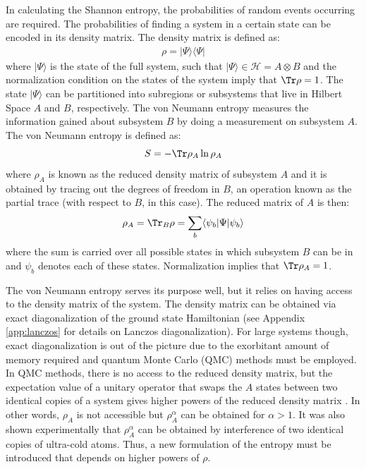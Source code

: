 	In calculating the Shannon entropy, the probabilities of random events occurring are required. The probabilities of finding a system in a certain state can be encoded in its density matrix. The density matrix is defined as:	
	\begin{align}
	\label{eq:densityMatrix}
	\rho = \vert \Psi \rangle \langle \Psi \vert
	\end{align}
	where $\vert\Psi\rangle$ is the state of the full system, such that $\vert \Psi \rangle \in \mathcal{H} = A \otimes B$ and the normalization condition on the states of the system imply that $\Tr \rho = 1$. The state $\vert \Psi \rangle$ can be partitioned into subregions or subsystems that live in Hilbert Space $A$ and $B$, respectively. The von Neumann entropy measures the information gained about subsystem $B$ by doing a measurement on subsystem $A$. The von Neumann entropy is defined as:
	\begin{equation}
	S = -\Tr\rho_{A} \ln{\rho_A}
	\label{eq:vonNeumannEntropy}
	\end{equation}
	where $\rho_A$ is known as the reduced density matrix of subsystem $A$ and it is obtained by tracing out the degrees of freedom in $B$, an operation known as the partial trace (with respect to $B$, in this case). The reduced matrix of $A$ is then:
	\begin{equation}
	\rho_{A} = \Tr_B \rho = \sum_b \langle \psi_b \vert \Psi \vert \psi_b \rangle
	\label{eq:partialTrace}
	\end{equation}
	where the sum is carried over all possible states in which subsystem $B$ can be in and $\psi_b$ denotes each of these states. Normalization implies that $\Tr \rho_A = 1$.
	
	The von Neumann entropy serves its purpose well, but it relies on having access to the density matrix of the system. The density matrix can be obtained via exact diagonalization of the ground state Hamiltonian (see Appendix \ref{app:lanczos} for details on Lanczos diagonalization). For large systems though, exact diagonalization is out of the picture due to the exorbitant amount of memory required and quantum Monte Carlo (QMC) methods must be employed. In QMC methods, there is no access to the reduced density matrix, but the expectation value of a unitary operator that swaps the $A$ states between two identical copies of a system gives higher powers of the reduced density matrix \cite{Hastings:2010dc}. In other words, $\rho_{A}$ is not accessible but $\rho_{A}^{\alpha}$ can be obtained for $\alpha > 1$. It was also shown experimentally \cite{Islam:2015cm}  that $\rho_A^{\alpha}$ can be obtained by interference of two identical copies of ultra-cold atoms. Thus, a new formulation of the entropy must be introduced that depends on higher powers of $\rho$.
	
